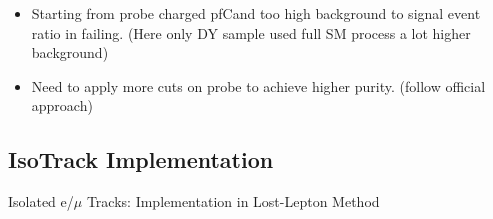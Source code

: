 \documentclass{beamer}
\begin{document}
\begin{frame}
\begin{columns}
\begin{column}{0.33\textwidth}
   \end{column}
  \end{columns}
\begin{itemize}
 \item Starting from probe charged pfCand too high background to signal event ratio in failing. (Here only DY sample used full SM process a lot higher background)
 \item Need to apply more cuts on probe to achieve higher purity. (follow official approach)
\end{itemize}
\end{frame}

\subsection{IsoTrack Implementation}
\begin{frame}
 \begin{block}{}
 \centering
 \Large Isolated e/$\mu$ Tracks: Implementation in Lost-Lepton Method
 \end{block}
\end{frame}
\end{document}
